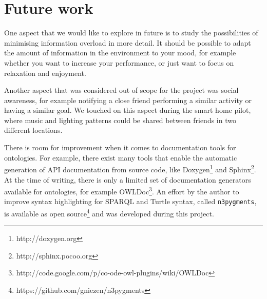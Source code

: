 \section{Future work}

One aspect that we would like to explore in future is to study the possibilities of minimising information overload in more detail. It should be possible to adapt the amount of information in the environment to your mood, for example whether you want to increase your performance, or just want to focus on relaxation and enjoyment.

Another aspect that was considered out of scope for the project was social awareness, for example notifying a close friend performing a similar activity or having a similar goal. We touched on this aspect during the smart home pilot, where music and lighting patterns could be shared between friends in two different locations.


There is room for improvement when it comes to documentation tools for ontologies. For example, there exist many tools that enable the automatic generation of \ac{API} documentation from source code, like Doxygen\footnote{http://doxygen.org} and Sphinx\footnote{http://sphinx.pocoo.org}. At the time of writing, there is only a limited set of documentation generators available for ontologies, for example OWLDoc\footnote{http://code.google.com/p/co-ode-owl-plugins/wiki/OWLDoc}. An effort by the author to improve syntax highlighting for \ac{SPARQL} and Turtle syntax, called \texttt{n3pygments}, is available as open source\footnote{https://github.com/gniezen/n3pygments} and was developed during this project.



